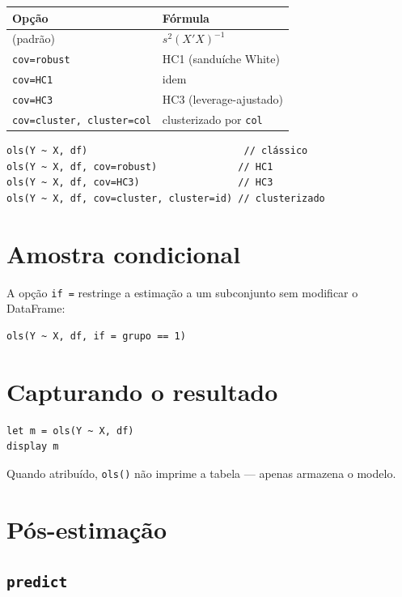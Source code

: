\begin{center}
\begin{tabular}{ll}
\toprule
\textbf{Opção} & \textbf{Fórmula} \\
\midrule
(padrão)                            & $s^2(X'X)^{-1}$ \\
\texttt{cov=robust}                 & HC1 (sanduíche White) \\
\texttt{cov=HC1}                    & idem \\
\texttt{cov=HC3}                    & HC3 (leverage-ajustado) \\
\texttt{cov=cluster, cluster=col}   & clusterizado por \texttt{col} \\
\bottomrule
\end{tabular}
\end{center}

\begin{lstlisting}[caption={Variantes de erro padrão}]
ols(Y ~ X, df)                           // clássico
ols(Y ~ X, df, cov=robust)              // HC1
ols(Y ~ X, df, cov=HC3)                 // HC3
ols(Y ~ X, df, cov=cluster, cluster=id) // clusterizado
\end{lstlisting}

\section{Amostra condicional}

A opção \lstinline{if =} restringe a estimação a um subconjunto sem modificar o DataFrame:

\begin{lstlisting}
ols(Y ~ X, df, if = grupo == 1)
\end{lstlisting}

\section{Capturando o resultado}

\begin{lstlisting}
let m = ols(Y ~ X, df)
display m
\end{lstlisting}

Quando atribuído, \lstinline{ols()} não imprime a tabela — apenas armazena o modelo.

\section{Pós-estimação}

\subsection{\texttt{predict}}

